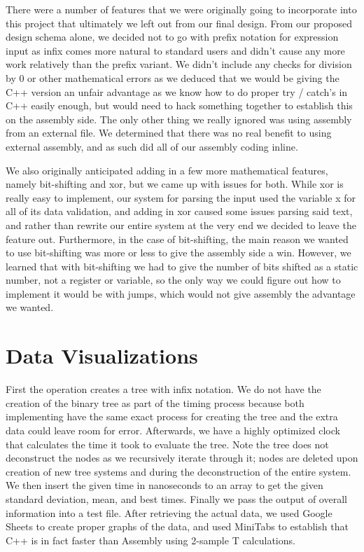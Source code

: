 \documentclass[a4paper,10pt]{article}
\begin{document}
\smallskip
There were a number of features that we were originally going to incorporate into this project that ultimately we left out from our final design. From our proposed design schema alone, we decided not to go with prefix notation for expression input as infix comes more natural to standard users and didn't cause any more work relatively than the prefix variant. We didn't include any checks for division by 0 or other mathematical errors as we deduced that we would be giving the C++ version an unfair advantage as we know how to do proper try / catch's in C++ easily enough, but would need to hack something together to establish this on the assembly side. The only other thing we really ignored was using assembly from an external file. We determined that there was no real benefit to using external assembly, and as such did all of our assembly coding inline.

\smallskip
We also originally anticipated adding in a few more mathematical features, namely bit-shifting and xor, but we came up with issues for both. While xor is really easy to implement, our system for parsing the input used the variable x for all of its data validation, and adding in xor caused some issues parsing said text, and rather than rewrite our entire system at the very end we decided to leave the feature out. Furthermore, in the case of bit-shifting, the main reason we wanted to use bit-shifting was more or less to give the assembly side a win. However, we learned that with bit-shifting we had to give the number of bits shifted as a static number, not a register or variable, so the only way we could figure out how to implement it would be with jumps, which would not give assembly the advantage we wanted.

\section*{Data Visualizations}
\smallskip
First the operation creates a tree with infix notation. We do not have the creation of the binary tree as part of the timing process because both implementing have the same exact process for creating the tree and the extra data could leave room for error. Afterwards, we have a highly optimized clock that calculates the time it took to evaluate the tree. Note the tree does not deconstruct the nodes as we recursively iterate through it; nodes are deleted upon creation of new tree systems and during the deconstruction of the entire system. We then insert the given time in nanoseconds to an array to get the given standard deviation, mean, and best times. Finally we pass the output of overall information into a test file. After retrieving the actual data, we used Google Sheets to create proper graphs of the data, and used MiniTabs to establish that C++ is in fact faster than Assembly using 2-sample T calculations.
\end{document}

